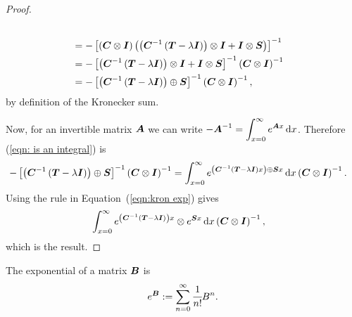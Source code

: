 \begin{proof}
\begin{align}
		\\&= - \left[\left(\boldsymbol{C}\otimes \boldsymbol{I}\right)\left(\left(\boldsymbol{C}^{-1}\left(\boldsymbol{T}-\lambda \boldsymbol{I}\right)\right)\otimes \boldsymbol{I} + \boldsymbol{I}\otimes \boldsymbol{S}\right)\right]^{-1} \nonumber
		\\&= - \left[\left(\boldsymbol{C}^{-1}\left(\boldsymbol{T}-\lambda \boldsymbol{I}\right)\right)\otimes \boldsymbol{I} + \boldsymbol{I}\otimes \boldsymbol{S}\right]^{-1}\left(\boldsymbol{C}\otimes \boldsymbol{I}\right)^{-1} \nonumber
		\\&= - \left[\left(\boldsymbol{C}^{-1}\left(\boldsymbol{T}-\lambda \boldsymbol{I}\right)\right)\oplus \boldsymbol{S}\right]^{-1}\left(\boldsymbol{C}\otimes \boldsymbol{I}\right)^{-1},\label{eqn: is an integral}
	\end{align}
	by definition of the Kronecker sum.
	
	Now, for an invertible matrix \(\boldsymbol A\) we can write \(-\boldsymbol A^{-1} = \displaystyle\int_{x=0}^\infty e^{\boldsymbol Ax}\, \mathrm{d} x\). Therefore (\ref{eqn: is an integral}) is 
	\begin{align*}
		-\left[\left(\boldsymbol{C}^{-1}\left(\boldsymbol{T}-\lambda \boldsymbol{I}\right)\right)\oplus \boldsymbol{S}\right]^{-1}\left(\boldsymbol{C}\otimes \boldsymbol{I}\right)^{-1}
		&= \int_{x=0}^\infty e^{\left(\boldsymbol{C}^{-1}\left(\boldsymbol{T}-\lambda \boldsymbol{I}\right)x\right)\oplus \boldsymbol{S}x}\, \mathrm{d} x\left(\boldsymbol{C}\otimes \boldsymbol{I}\right)^{-1}.
	\end{align*}
	{Using the rule in Equation~(\ref{eqn:kron exp}) gives }
	\begin{align*}
		&\int_{x=0}^\infty e^{\left(\boldsymbol{C}^{-1}\left(\boldsymbol{T}-\lambda \boldsymbol{I}\right)\right)x}\otimes e^{ \boldsymbol{S}x}\, \mathrm{d} x\left(\boldsymbol{C}\otimes \boldsymbol{I}\right)^{-1},
	\end{align*}
	which is the result.
\end{proof}


The exponential of a matrix \(\boldsymbol B\) is \[e^{\boldsymbol B} := \sum_{n=0}^\infty \cfrac{1}{n!}B^n.\]

